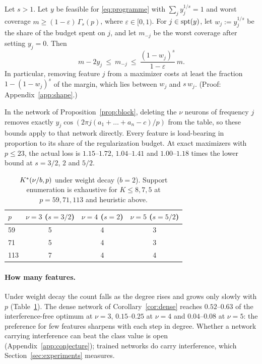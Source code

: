 \begin{proposition}\label{prop:ablation}
Let $s>1$. Let $y$ be feasible for \eqref{eq:programme} with $\sum_jy_j^{1/s}=1$ and worst coverage $m\ge(1-\varepsilon)\,\Gamma_s(p)$, where $\varepsilon\in[0,1)$. For $j\in\mathrm{spt}(y)$, let $w_j:=y_j^{1/s}$ be the share of the budget spent on $j$, and let $m_{-j}$ be the worst coverage after setting $y_j=0$. Then
\[
m-2y_j\ \le\ m_{-j}\ \le\ \frac{(1-w_j)^s}{1-\varepsilon}\,m .
\]
In particular, removing feature $j$ from a maximizer costs at least the fraction $1-(1-w_j)^s$ of the margin, which lies between $w_j$ and $s\,w_j$. (Proof: Appendix~\ref{app:shape}.)
\end{proposition}

In the network of Proposition~\ref{prop:block}, deleting the $\nu$ neurons of frequency $j$ removes exactly $y_j\cos(2\pi j(a_1+\dots+a_n-c)/p)$ from the table, so these bounds apply to that network directly. Every feature is load-bearing in proportion to its share of the regularization budget. At exact maximizers with $p\le23$, the actual loss is $1.15$--$1.72$, $1.04$--$1.41$ and $1.00$--$1.18$ times the lower bound at $s=3/2$, $2$ and $5/2$.

\begin{table}[t]
\centering
\caption{$K^{*}(\nu/b,p)$ under weight decay ($b=2$). Support enumeration is exhaustive for $K\le8,7,5$ at $p=59,71,113$ and heuristic above.}
\label{tab:kstar}
\begin{tabular}{lccc}
\toprule
$p$ & $\nu=3$ ($s=3/2$) & $\nu=4$ ($s=2$) & $\nu=5$ ($s=5/2$)\\
\midrule
59 & 5 & 4 & 3\\
71 & 5 & 4 & 3\\
113 & 7 & 4 & 4\\
\bottomrule
\end{tabular}
\end{table}

\paragraph{How many features.} Under weight decay the count falls as the degree rises and grows only slowly with $p$ (Table~\ref{tab:kstar}). The dense network of Corollary~\ref{cor:dense} reaches $0.52$--$0.63$ of the interference-free optimum at $\nu=3$, $0.15$--$0.25$ at $\nu=4$ and $0.04$--$0.08$ at $\nu=5$: the preference for few features sharpens with each step in degree. Whether a network carrying interference can beat the class value is open (Appendix~\ref{app:conjecture}); trained networks do carry interference, which Section~\ref{sec:experiments} measures.

